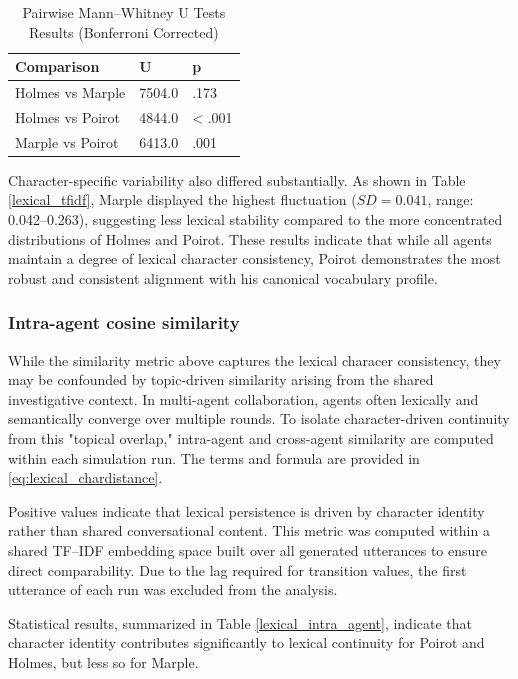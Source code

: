 \documentclass{article}
\begin{document}
\begin{table}[H]
\centering
\begin{tabular}{l l l}\toprule
Comparison & U & p \\\midrule
Holmes vs Marple & 7504.0& .173 \\
Holmes vs Poirot & 4844.0& < .001 \\
Marple vs Poirot & 6413.0& .001 \\ \bottomrule
\end{tabular}
\caption{Pairwise Mann–Whitney U Tests Results (Bonferroni Corrected)}
\label{lexical_utest}
\end{table}


Character-specific variability also differed substantially. As shown in Table \ref{lexical_tfidf}, Marple displayed the highest fluctuation ($SD=0.041$, range: 0.042–0.263), suggesting less lexical stability compared to the more concentrated distributions of Holmes and Poirot. These results indicate that while all agents maintain a degree of lexical character consistency, Poirot demonstrates the most robust and consistent alignment with his canonical vocabulary profile.

\subsubsection{Intra-agent cosine similarity}

While the similarity metric above captures the lexical characer consistency, they may be confounded by topic-driven similarity arising from the shared investigative context. In multi-agent collaboration, agents often lexically and semantically converge over multiple rounds. To isolate character-driven continuity from this "topical overlap,"  intra-agent and cross-agent similarity are computed within each simulation run. The terms and formula are provided in \ref{eq:lexical_chardistance}.

Positive values indicate that lexical persistence is driven by character identity rather than shared conversational content. This metric was computed within a shared TF–IDF embedding space built over all generated utterances to ensure direct comparability. Due to the lag required for transition values, the first utterance of each run was excluded from the analysis.

Statistical results, summarized in Table \ref{lexical_intra_agent}, indicate that character identity contributes significantly to lexical continuity for Poirot and Holmes, but less so for Marple.
\end{document}

